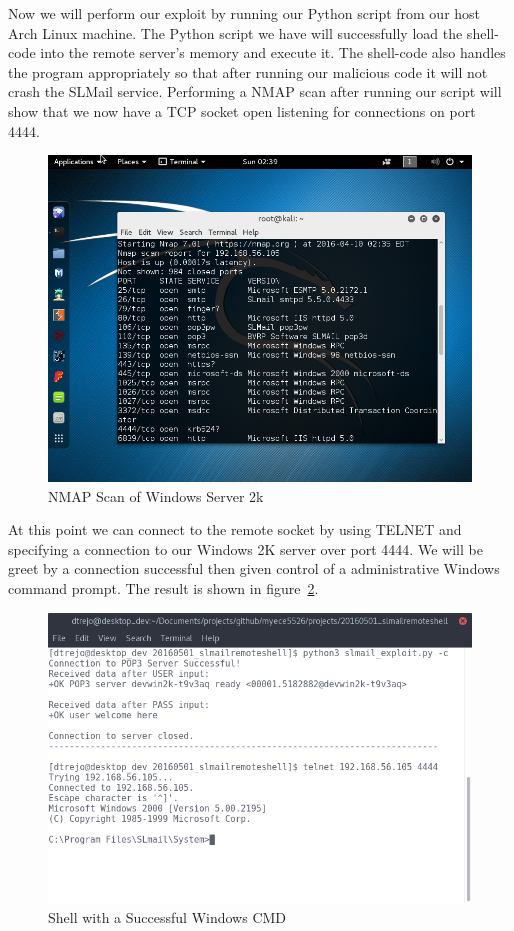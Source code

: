 \documentclass[12pt]{article}
\begin{document}
Now we will perform our exploit by running our Python script from our host
Arch Linux machine. The Python script we have will successfully load the 
shell-code into the remote server's memory and execute it. The shell-code 
also handles the program appropriately so that after running our malicious 
code it will not crash the SLMail service. Performing a NMAP scan after 
running our script will show that we now have a TCP socket open listening 
for connections on port 4444. 

\begin{figure}[ht]
    \centering
    \includegraphics[width=5.5in]{images/20160504_nmap01.png}
    \caption{NMAP Scan of Windows Server 2k}
    \label{fig:nmapwindows2}
\end{figure}

At this point we can connect to the remote socket by using TELNET and
specifying a connection to our Windows 2K server over port 4444. We
will be greet by a connection successful then given control of a 
administrative Windows command prompt. The result is shown in 
figure~\ref{fig:exploited}.

\begin{figure}[H]
    \centering
    \includegraphics[width=5.5in]{images/20160504_exploited.png}
    \caption{Shell with a Successful Windows CMD}
    \label{fig:exploited}
\end{figure}
\end{document}
